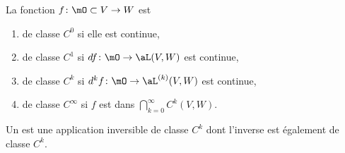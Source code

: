 \begin{definition}  \label{DefPNjMGqy}
    La fonction \( f\colon \mO\subset V\to W\) est
    \begin{enumerate}
        \item
            de classe \( C^0\) si elle est continue,
        \item
            de classe \( C^1\) si \( df\colon \mO\to \aL(V,W)\) est continue,
        \item
            de classe \( C^k\) si \( d^kf\colon \mO\to \aL^{(k)}(V,W)\) est continue,
        \item
            de classe \(  C^{\infty}\) si \( f\) est dans \( \bigcap_{k=0}^{\infty}C^k(V,W)\).
    \end{enumerate}
\end{definition}

\begin{definition}
    Un  est une application inversible de classe \( C^k\) dont l'inverse est également de classe \( C^k\).
\end{definition}

